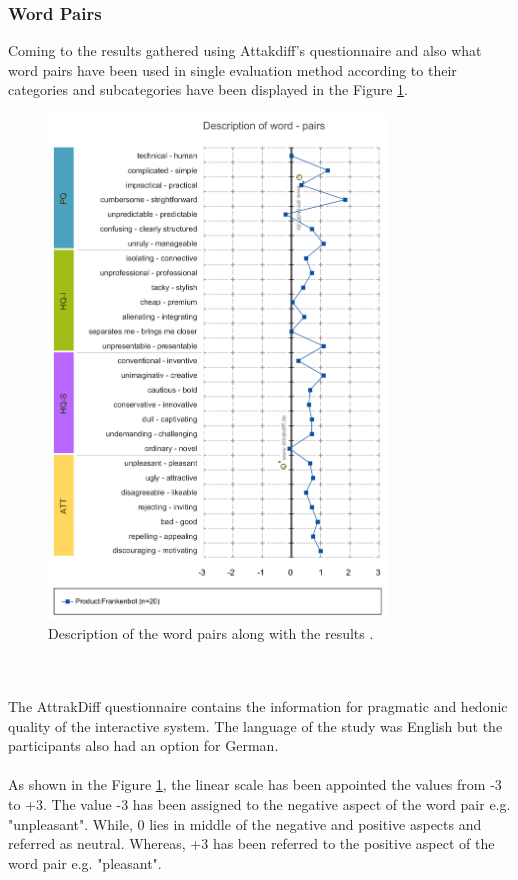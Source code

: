 \subsubsection*{Word Pairs}
Coming to the results gathered using Attakdiff's questionnaire and also what word pairs have been used in single evaluation method according to their categories and subcategories have been displayed in the Figure \ref{fig:descofWordPair}.

\begin{figure}[!h]
    \centering
    \includegraphics[width=0.8\textwidth]{img/Description_of_word_pairs.png}
    \caption{Description of the word pairs along with the results \cite{attrakdiff}.}
    \label{fig:descofWordPair}
\end{figure}
\\~\\
The AttrakDiff questionnaire contains the information for pragmatic and hedonic quality of the interactive system. The language of the study was English but the participants also had an option for German.
\\~\\
As shown in the Figure \ref{fig:descofWordPair}, the linear scale has been appointed the values from -3 to +3. The value -3 has been assigned to the negative aspect of the word pair e.g. "unpleasant". While, 0 lies in middle of the negative and positive aspects and referred as neutral. Whereas, +3 has been referred to the positive aspect of the word pair e.g. "pleasant".
